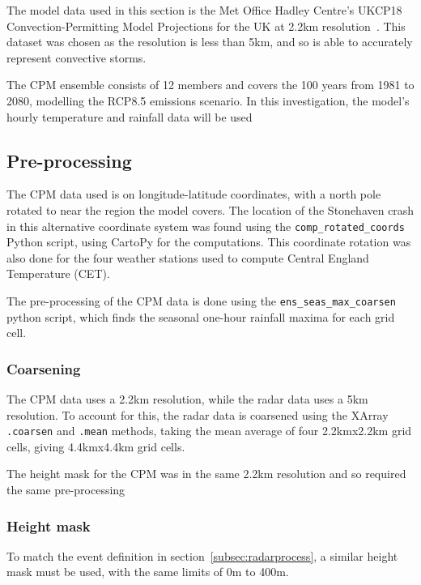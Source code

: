 The model data used in this section is
    the Met Office Hadley Centre's UKCP18 Convection-Permitting Model Projections for the UK at 2.2km resolution~\cite{model_data}.
This dataset was chosen as the resolution is less than 5km,
    and so is able to accurately represent convective storms.

The CPM ensemble consists of 12 members and covers the 100 years from 1981 to 2080,
    modelling the RCP8.5 emissions scenario.
In this investigation,
    the model's hourly temperature and rainfall data will be used

\subsection{Pre-processing}\label{subsec:preprocess}

The CPM data used is on longitude-latitude coordinates,
    with a north pole rotated to near the region the model covers.
The location of the Stonehaven crash in this alternative coordinate system was found using the \texttt{comp\_rotated\_coords} Python script,
    using CartoPy for the computations.
This coordinate rotation was also done for the four weather stations used to compute Central England Temperature (CET).

The pre-processing of the CPM data is done using the \texttt{ens\_seas\_max\_coarsen} python script,
    which finds the seasonal one-hour rainfall maxima for each grid cell.

\subsubsection{Coarsening}

The CPM data uses a 2.2km resolution,
    while the radar data uses a 5km resolution.
To account for this,
    the radar data is coarsened using the XArray \texttt{.coarsen} and \texttt{.mean} methods,
    taking the mean average of four 2.2kmx2.2km grid cells, giving 4.4kmx4.4km grid cells.

The height mask for the CPM was in the same 2.2km resolution
    and so required the same pre-processing

\subsubsection{Height mask}

To match the event definition in section~\ref{subsec:radarprocess},
    a similar height mask must be used,
    with the same limits of 0m to 400m.

